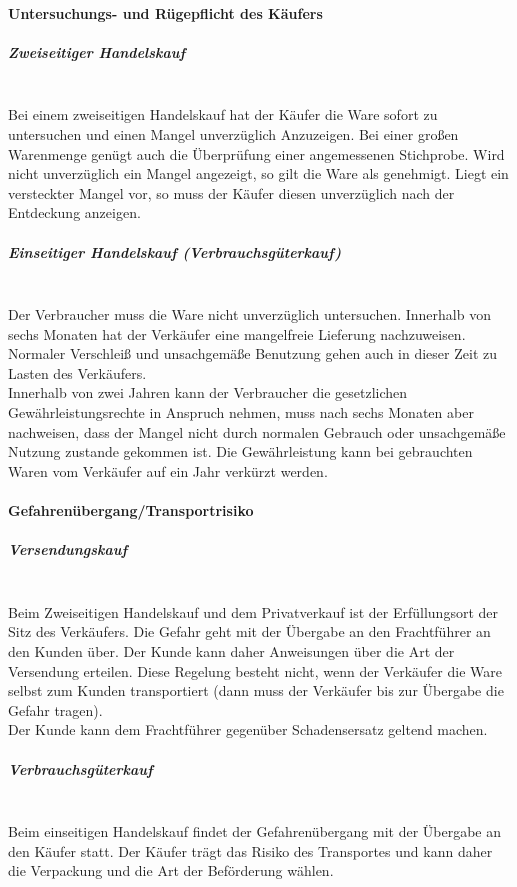 	\paragraph{Untersuchungs- und Rügepflicht des Käufers} 
		\subparagraph{Zweiseitiger Handelskauf}~\\Bei einem zweiseitigen Handelskauf hat der Käufer die Ware sofort zu untersuchen und einen Mangel unverzüglich Anzuzeigen. Bei einer großen Warenmenge genügt auch die Überprüfung einer angemessenen Stichprobe. Wird nicht unverzüglich ein Mangel angezeigt, so gilt die Ware als genehmigt. Liegt ein versteckter Mangel vor, so muss der Käufer diesen unverzüglich nach der Entdeckung anzeigen.
		\subparagraph{Einseitiger Handelskauf (Verbrauchsgüterkauf)}~\\Der Verbraucher muss die Ware nicht unverzüglich untersuchen. Innerhalb von sechs Monaten hat der Verkäufer eine mangelfreie Lieferung nachzuweisen. Normaler Verschleiß und unsachgemäße Benutzung gehen auch in dieser Zeit zu Lasten des Verkäufers.\\
		Innerhalb von zwei Jahren kann der Verbraucher die gesetzlichen Gewährleistungsrechte in Anspruch nehmen, muss nach sechs Monaten aber nachweisen, dass der Mangel nicht durch normalen Gebrauch oder unsachgemäße Nutzung zustande gekommen ist. Die Gewährleistung kann bei gebrauchten Waren vom Verkäufer auf ein Jahr verkürzt werden.
	
	\paragraph{Gefahrenübergang/Transportrisiko}
		\subparagraph{Versendungskauf}~\\Beim Zweiseitigen Handelskauf und dem Privatverkauf ist der Erfüllungsort der Sitz des Verkäufers. Die Gefahr geht mit der Übergabe an den Frachtführer an den Kunden über. Der Kunde kann daher Anweisungen über die Art der Versendung erteilen. Diese Regelung besteht nicht, wenn der Verkäufer die Ware selbst zum Kunden transportiert (dann muss der Verkäufer bis zur Übergabe die Gefahr tragen).\\
		Der Kunde kann dem Frachtführer gegenüber Schadensersatz geltend machen.
		\subparagraph{Verbrauchsgüterkauf}~\\Beim einseitigen Handelskauf findet der Gefahrenübergang mit der Übergabe an den Käufer statt. Der Käufer trägt das Risiko des Transportes und kann daher die Verpackung und die Art der Beförderung wählen.
	
